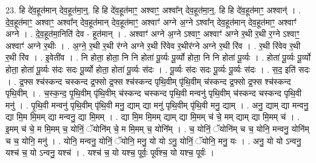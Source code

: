 \documentclass[17pt]{extarticle}
\begin{document}
23. हि दे॑व॒हूत॑मान् देव॒हूत॑मा॒न्॒. हि हि दे॑व॒हूत॑माꣳ॒॒ अश्वाꣳ॒॒ अश्वा᳚न् देव॒हूत॑मा॒न्॒. हि हि दे॑व॒हूत॑माꣳ॒॒ अश्वान्॑ । . दे॒व॒हूत॑माꣳ॒॒ अश्वाꣳ॒॒ अश्वा᳚न् देव॒हूत॑मान् देव॒हूत॑माꣳ॒॒ अश्वाꣳ॑ अग्ने अ॒ग्ने ऽश्वा᳚न् देव॒हूत॑मान् देव॒हूत॑माꣳ॒॒ अश्वाꣳ॑ अग्ने । . दे॒व॒हूत॑मा॒निति॑ देव - हूत॑मान् । . अश्वाꣳ॑ अग्ने अ॒ग्ने ऽश्वाꣳ॒॒ अश्वाꣳ॑ अग्ने र॒थी र॒थी र॒ग्ने ऽश्वाꣳ॒॒ अश्वाꣳ॑ अग्ने र॒थीः । . अ॒ग्ने॒ र॒थी र॒थी र॑ग्ने अग्ने र॒थी रि॑वेव र॒थीर॑ग्ने अग्ने र॒थी रि॑व । . र॒थी रि॑वेव र॒थी र॒थी रि॑व । . इ॒वेती॑व । . नि होता॒ होता॒ नि नि होता॑ पू॒र्व्यः पू॒र्व्यो होता॒ नि नि होता॑ पू॒र्व्यः । . होता॑ पू॒र्व्यः पू॒र्व्यो होता॒ होता॑ पू॒र्व्यः स॑दः सदः पू॒र्व्यो होता॒ होता॑ पू॒र्व्यः स॑दः । . पू॒र्व्यः स॑दः सदः पू॒र्व्यः पू॒र्व्यः स॑दः । . स॒द॒ इति॑ सदः । . द्र॒फ्स श्च॑स्कन्द चस्कन्द द्र॒फ्सो द्र॒फ्स श्च॑स्कन्द पृथि॒वीम् पृ॑थि॒वीम् च॑स्कन्द द्र॒फ्सो द्र॒फ्स श्च॑स्कन्द पृथि॒वीम् । . च॒स्क॒न्द॒ पृ॒थि॒वीम् पृ॑थि॒वीम् च॑स्कन्द चस्कन्द पृथि॒वी मन्वनु॑ पृथि॒वीम् च॑स्कन्द चस्कन्द पृथि॒वी मनु॑ । . पृ॒थि॒वी मन्वनु॑ पृथि॒वीम् पृ॑थि॒वी मनु॒ द्याम् द्या मनु॑ पृथि॒वीम् पृ॑थि॒वी मनु॒ द्याम् । . अनु॒ द्याम् द्या मन्वनु॒ द्या मि॒म मि॒मम् द्या मन्वनु॒ द्या मि॒मम् । . द्या मि॒म मि॒मम् द्याम् द्या मि॒मम् च॑ चे॒ मम् द्याम् द्या मि॒मम् च॑ । . इ॒मम् च॑ चे॒ म मि॒मम् च॒ योनिं॒ ॅयोनि॑म् चे॒ म मि॒मम् च॒ योनि᳚म् । . च॒ योनिं॒ ॅयोनि॑म् च च॒ योनि॒ मन्वनु॒ योनि॑म् च च॒ योनि॒ मनु॑ । . योनि॒ मन्वनु॒ योनिं॒ ॅयोनि॒ मनु॒ यो यो ऽनु॒ योनिं॒ ॅयोनि॒ मनु॒ यः । . अनु॒ यो यो ऽन्वनु॒ यश्च॑ च॒ यो ऽन्वनु॒ यश्च॑ । . यश्च॑ च॒ यो यश्च॒ पूर्वः॒ पूर्व॑श्च॒ यो यश्च॒ पूर्वः॑ । \newline
\end{document}
